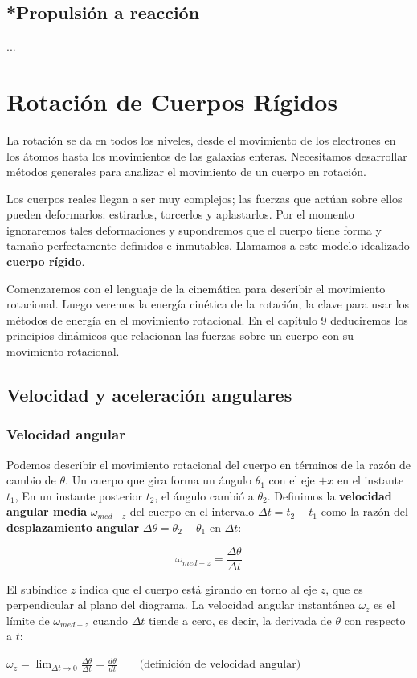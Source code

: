 \documentclass{article}
\newcommand{\newsection}[1]{
    \pagebreak
    {\color{sectionColor}
    \centering
    \section{\bl{#1}}}
    \color{black}
    \vspace{0.5cm}
}
\newcommand{\newsubsection}[1]{
    \vspace{0.5cm}
    \color{sectionColor}
    \subsection{\bl{#1}}
    \color{black}
    \vspace{0.5cm}
}
\newcommand{\newtitle}[1]{
    \color{titleColor}
    \subsubsection{#1}
    \color{black}
}
\newcommand{\bl}[1]{\textbf{#1}}
\newcommand{\definicion}[1]{%
    \vspace{0.5cm}
    \begin{definicionbox}
        #1
    \end{definicionbox}
    \vspace{0.5cm}
}
\begin{document}
    \newsubsection{*Propulsión a reacción}

    \par ... %



    \newsection{Rotación de Cuerpos Rígidos}

    \par La rotación se da en todos los niveles, desde el movimiento de los electrones en los átomos hasta los movimientos de las galaxias enteras. Necesitamos desarrollar métodos generales para analizar el movimiento de un cuerpo en rotación.
    \par Los cuerpos reales llegan a ser muy complejos; las fuerzas que actúan sobre ellos pueden deformarlos: estirarlos, torcerlos y aplastarlos. Por el momento ignoraremos tales deformaciones y supondremos que el cuerpo tiene forma y tamaño perfectamente deﬁnidos e inmutables. Llamamos a este modelo idealizado \bl{cuerpo rígido}.
    \par Comenzaremos con el lenguaje de la cinemática para describir el movimiento rotacional. Luego veremos la energía cinética de la rotación, la clave para usar los métodos de energía en el movimiento rotacional. En el capítulo 9 deduciremos los principios dinámicos que relacionan las fuerzas sobre un cuerpo con su movimiento rotacional.

    \newsubsection{Velocidad y aceleración angulares}

    \newtitle{Velocidad angular}

    \par Podemos describir el movimiento rotacional del cuerpo en términos de la razón de cambio de $\theta$. Un cuerpo que gira forma un ángulo $\theta_1$ con el eje $+x$ en el instante $t_1$, En un instante posterior $t_2$, el ángulo cambió a $\theta_2$. Deﬁnimos la \bl{velocidad angular media} $\omega_{med-z}$ del cuerpo en el intervalo $\Delta t = t_2 - t_1$ como la razón del \bl{desplazamiento angular} $\Delta \theta = \theta_2 - \theta_1$ en $\Delta t$:
    
    \[ \omega_{med-z} = \frac{\Delta \theta}{\Delta t} \]

    \par El subíndice $z$ indica que el cuerpo está girando en torno al eje $z$, que es perpendicular al plano del diagrama. La velocidad angular instantánea $\omega_z$ es el límite de $\omega_{med-z}$ cuando $\Delta t$ tiende a cero, es decir, la derivada de $\theta$ con respecto a $t$:

    \definicion{
        \centering
        \( \omega_z = \lim_{\Delta t \to 0} \frac{\Delta \theta}{\Delta t} = \frac{d\theta}{dt} \quad \quad \text{(deﬁnición de velocidad angular)} \)
    }
\end{document}
